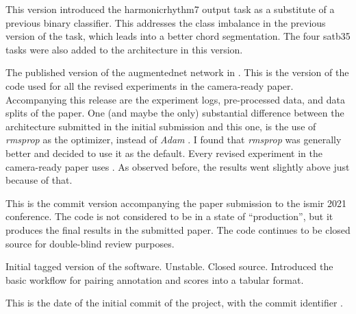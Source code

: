 This version introduced the \gls{harmonicrhythm7} output
task as a substitute of a previous binary classifier. This
addresses the class imbalance in the previous version of the
task, which leads into a better chord segmentation. The four
\gls{satb35} tasks were also added to the architecture in
this version. 

The published version of the \gls{augmentednet} network in
\textcite{napoleslopez2021augmentednet}. This is the version
of the code used for all the revised experiments in the
camera-ready paper. Accompanying this release are the
experiment logs, pre-processed data, and data splits of the
paper. One (and maybe the only) substantial difference
between the architecture submitted in the initial submission
and this one, is the use of \emph{rmsprop} as the optimizer,
instead of \emph{Adam} \parencite{kingma2014adam}. I found
that \emph{rmsprop} was generally better and decided to use
it as the default. Every revised experiment in the
camera-ready paper uses . As observed before,
the results went slightly above just because of that.

This is the commit version accompanying the paper submission
to the \gls{ismir} 2021 conference. The code is not
considered to be in a state of ``production'', but it
produces the final results in the submitted paper. The code
continues to be closed source for double-blind review
purposes.

Initial tagged version of the software. Unstable. Closed
source. Introduced the basic workflow for pairing annotation
and scores into a tabular format.


This is the date of the initial commit of the project, with
the commit identifier .
    


